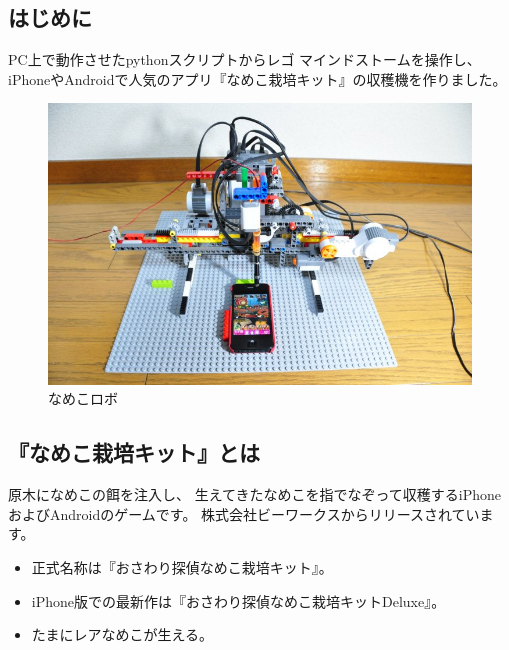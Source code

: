 \documentclass[mingoth,a4paper]{jsarticle}
\begin{document}



\subsection{はじめに}

PC上で動作させたpythonスクリプトからレゴ マインドストームを操作し、
iPhoneやAndroidで人気のアプリ『なめこ栽培キット』の収穫機を作りました。

\begin{figure}[ht]
  \begin{center}
    \includegraphics[width=0.7\hsize]{image201210/nxt-python_namekorobo2.jpg}
  \end{center}
  \caption{なめこロボ}
  \label{fig:namekorobo2}
\end{figure}

\subsection{『なめこ栽培キット』とは}

原木になめこの餌を注入し、
生えてきたなめこを指でなぞって収穫するiPhoneおよびAndroidのゲームです。
株式会社ビーワークスからリリースされています。

\begin{itemize}
\item 正式名称は『おさわり探偵なめこ栽培キット』。
\item iPhone版での最新作は『おさわり探偵なめこ栽培キットDeluxe』。
\item たまにレアなめこが生える。
\end{itemize}
\end{document}
